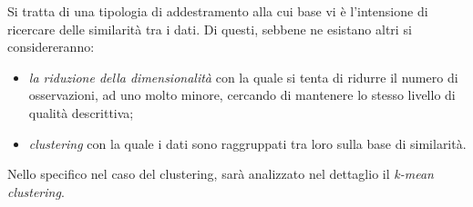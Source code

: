 \documentclass{subfiles}
\begin{document}
Si tratta di una tipologia di addestramento alla cui base vi è l'intensione di ricercare delle similarità tra i dati.
Di questi, sebbene ne esistano altri si considereranno:
\begin{itemize}
    \item \emph{la riduzione della dimensionalità} con la quale si tenta di ridurre il numero di osservazioni,
          ad uno molto minore, cercando di mantenere lo stesso livello di qualità descrittiva;
    \item \emph{clustering} con la quale i dati sono raggruppati tra loro sulla base di similarità.
\end{itemize}
\begin{Remark*}
    Nello specifico nel caso del clustering, sarà analizzato nel dettaglio il \emph{k-mean clustering}.
\end{Remark*}
\end{document}
